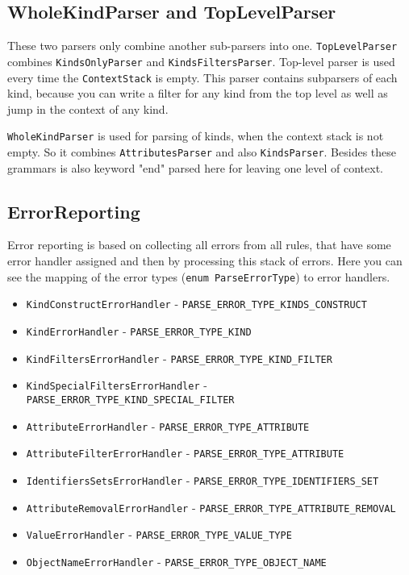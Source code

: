 \documentclass[deska]{subfiles}
\begin{document}
\subsection{WholeKindParser and TopLevelParser}

These two parsers only combine another sub-parsers into one. {\tt TopLevelParser} combines {\tt KindsOnlyParser} and
{\tt KindsFiltersParser}. Top-level parser is used every time the {\tt ContextStack} is empty. This parser contains subparsers
of each kind, because you can write a filter for any kind from the top level as well as jump in the context of any kind.

{\tt WholeKindParser} is used for parsing of kinds, when the context stack is not empty. So it combines {\tt AttributesParser}
and also {\tt KindsParser}. Besides these grammars is also keyword "end" parsed here for leaving one level of context.

\subsection{ErrorReporting}

Error reporting is based on collecting all errors from all rules, that have some error handler assigned and then by
processing this stack of errors. Here you can see the mapping of the error types ({\tt enum ParseErrorType}) to
error handlers.

\begin{itemize}
    \item {\tt KindConstructErrorHandler} - {\tt PARSE\_ERROR\_TYPE\_KINDS\_CONSTRUCT}
    \item {\tt KindErrorHandler} - {\tt PARSE\_ERROR\_TYPE\_KIND}
    \item {\tt KindFiltersErrorHandler} - {\tt PARSE\_ERROR\_TYPE\_KIND\_FILTER}
    \item {\tt KindSpecialFiltersErrorHandler} - {\tt PARSE\_ERROR\_TYPE\_KIND\_SPECIAL\_FILTER}
    \item {\tt AttributeErrorHandler} - {\tt PARSE\_ERROR\_TYPE\_ATTRIBUTE}
    \item {\tt AttributeFilterErrorHandler} - {\tt PARSE\_ERROR\_TYPE\_ATTRIBUTE}
    \item {\tt IdentifiersSetsErrorHandler} - {\tt PARSE\_ERROR\_TYPE\_IDENTIFIERS\_SET}
    \item {\tt AttributeRemovalErrorHandler} - {\tt PARSE\_ERROR\_TYPE\_ATTRIBUTE\_REMOVAL}
    \item {\tt ValueErrorHandler} - {\tt PARSE\_ERROR\_TYPE\_VALUE\_TYPE}
    \item {\tt ObjectNameErrorHandler} - {\tt PARSE\_ERROR\_TYPE\_OBJECT\_NAME}
\end{itemize}
\end{document}
